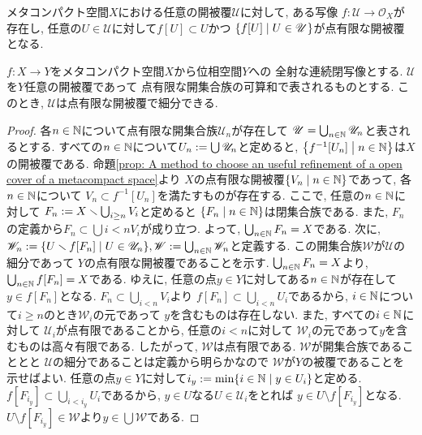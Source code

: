 \documentclass[uplatex, dvipdfmx, a4paper, 12pt, class=jsbook, crop=false]{standalone}
\begin{document}
\begin{proposition}
	\label{prop: A method to choose an useful refinement of a open cover of a metacompact space}
	メタコンパクト空間$ X $における任意の開被覆$ \mathscr{U} $に対して, ある写像
	$ f \colon \mathscr{U} \to \mathcal{O}_X $が存在し, 
	任意の$ U \in \mathscr{U} $に対して$ f[U] \subset U $かつ
	$ \setcomp{f[U]}{U \in \mathscr{U}} $が点有限な開被覆となる.
\end{proposition}

\begin{proposition}
	\label{prop: Every sigma-point-finite open covering of the closed image of a MetaCpt space has point a finite refinement}
	$ f \colon X \to Y $をメタコンパクト空間$ X $から位相空間$ Y $への
	全射な連続閉写像とする.
	$ \mathscr{U} $を$ Y $任意の開被覆であって
	点有限な開集合族の可算和で表されるものとする.
	このとき, $ \mathscr{U} $は点有限な開被覆で細分できる.
\end{proposition}

\begin{proof}
	各$ n \in \mathbb{N} $について点有限な開集合族$ \mathscr{U}_n $が存在して
	$ \mathscr{U} = \bigcup_{n \in \mathbb{N}} \mathscr{U}_n $と表されるとする.
	すべての$ n \in \mathbb{N} $について$ U_n \mathrel{:=} \bigcup \mathscr{U}_n $と定めると,
	$ \setcomp{f^{-1}[U_n]}{n \in \N} $は$ X $の開被覆である.
	命題\ref{prop: A method to choose an useful refinement of a open cover of a metacompact space}より
	$ X $の点有限な開被覆$ \setcomp{V_n}{n \in \N} $であって, 各$ n \in \mathbb{N} $について
	$ V_n \subset f^{-1}[U_n] $を満たすものが存在する.
	ここで, 任意の$ n \in \mathbb{N} $に対して
	$ F_n \mathrel{:=} X \smallsetminus \bigcup_{i\geq n} V_i $と定めると
	$ \setcomp{F_n}{n \in \N} $は閉集合族である. 
	また, $ F_n $の定義から$ F_n \subset \bigcup{i < n} V_i$が成り立つ.
	よって, $ \bigcup_{n \in \mathbb{N}} F_n = X $である.
	次に, $ \mathscr{W}_n \defeq \setcomp{U \setminus f[F_n]}{U \in \mathscr{U}_n}, 
	\mathscr{W} \defeq \bigcup_{n \in \N} \mathscr{W}_n $と定義する.
	この開集合族$ \mathscr{W} $が$ \mathscr{U} $の細分であって
	$ Y $の点有限な開被覆であることを示す.
	$ \bigcup_{n \in \mathbb{N}} F_n = X $より, $ \bigcup_{n \in \mathbb{N}} f[F_n] = X $である.
	ゆえに, 任意の点$ y \in Y $に対してある$ n \in \mathbb{N} $が存在して
	$ y \in f[F_n] $となる. $ F_n \subset \bigcup_{i < n} V_i $より
	$ f[F_n] \subset \bigcup_{i < n} U_i $であるから, 
	$ i \in \mathbb{N} $について$ i \geq n $のとき$ \mathscr{W}_i $の元であって
	$ y $を含むものは存在しない. また, すべての$ i \in \mathbb{N} $に対して
	$ \mathscr{U}_i $が点有限であることから, 任意の$ i < n $に対して
	$ \mathscr{W}_i $の元であって$ y $を含むものは高々有限である.
	したがって, $ \mathscr{W} $は点有限である. 
	$ \mathscr{W} $が開集合族であることとと
	$ \mathscr{U} $の細分であることは定義から明らかなので
	$ \mathscr{W} $が$ Y $の被覆であることを示せばよい.
	任意の点$ y \in Y $に対して$ i_y \defeq \min \setcomp{i \in \N}{y \in U_i} $と定める.
	$ f[F_{i_y}] \subset \bigcup_{i < i_y} U_i $であるから,
	$ y \in U $なる$ U \in \mathscr{U}_i $をとれば
	$ y \in U \setminus f[F_{i_y}] $となる.
	$ U \setminus f[F_{i_y}] \in \mathscr{W} $より$ y \in \bigcup \mathscr{W} $である.	
\end{proof}
\end{document}
